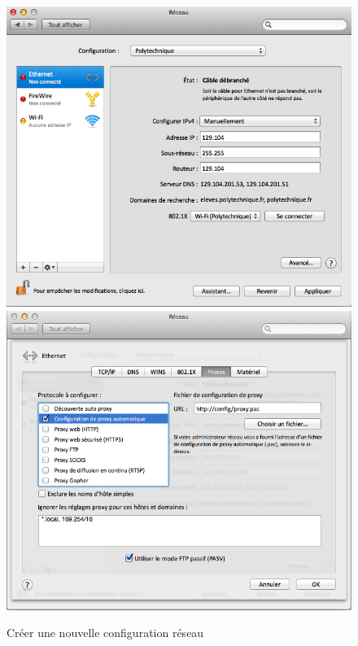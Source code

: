 \begin{figure}[h]
\begin{center}
{\begin{minipage}{0.43 \textwidth}
\begin{flushright}
        {\includegraphics[width=0.96 \textwidth]{images/mac_config_ip_mountain_lion}} \\
        {\includegraphics[width=0.96 \textwidth]{images/mac_config_proxy_mountain_lion}}
        \end{flushright}
        \end{minipage}
            \label{config:mac:ip:mountain_lion}   }
        \caption{Créer une nouvelle configuration réseau}

    \end{center}
  \end{figure}

